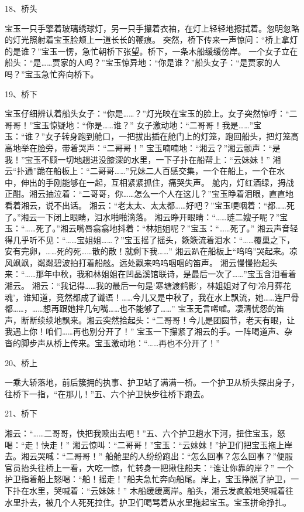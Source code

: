 18、桥头\par
宝玉一只手擎着玻璃绣球灯，另一只手攥着衣袖，在灯上轻轻地擦拭着。忽明忽略的灯光照射着宝玉脸颊上一道长长的鞭痕。
突然，桥下传来一声惊问：“桥上拿灯的是谁？”宝玉一愣，急忙朝桥下张望。桥下，一条木船缓缓傍岸。
一个女子立在船头：“是……贾家的人吗？”宝玉惊异地：“你是谁？”船头女子：“是贾家的人吗？”宝玉急忙奔向桥下。

19、桥下\par
宝玉仔细辨认着船头女子：“你是……？”灯光映在宝玉的脸上。女子突然惊呼：“二哥哥！”宝玉惊疑地：“你是……谁？”
女子激动地：“二哥哥！我是……”宝玉：“谁？”女子转身跑到舱口，一把拔出插在舱门上的灯笼，跑回船头，把灯笼高高地举在脸旁，带着哭声：“二哥哥！”
宝玉喃喃地：“湘云？”湘云颤声：“是我！”宝玉不顾一切地趟进没膝深的水里，一下子扑在船帮上：“云妹妹！”
湘云“扑通”跪在船板上：“二哥哥……”兄妹二人百感交集，一个在船上，一个在水中，伸出的手刚能够在一起，互相紧紧抓住，痛哭失声。
舱内，灯红酒绿，拇战正酣。湘云抽泣着：“二哥哥，你……怎么一个人在这儿？”宝玉睁着泪眼，直直地看着湘云，说不出话。
湘云：“老太太、太太都……好吧？”宝玉哽咽着：“都……死了。”湘云一下闭上眼睛，泪水啪啪滴落。
湘云睁开眼睛：“……琏二嫂子呢？”宝玉：“……死了。”湘云嘴唇翕翕地抖着：“林姐姐呢？”宝玉：“……死了。”
湘云声音轻得几乎听不见：“……宝姐姐……？”宝玉摇了摇头，簌簌流着泪水：“……覆巢之下，安有完卵，……死的死……散的散！就剩下我……”
湘云趴在船板上“呜呜”哭起来。凉风飒飒，粼粼碧波拍打着船舷。远处飘来呜呜咽咽的笛声。
湘云慢慢抬起头来：“……那年中秋，我和林姐姐在凹晶溪馆联诗，是最后一次了……”宝玉含泪看着湘云。
湘云：“我记得……我的最后一句是‘寒塘渡鹤影’，林姐姐对了句‘冷月葬花魂’，谁知道，竞然都成了谶语！……今儿又是中秋了，我在水上飘流，她……连尸骨都……，……想再跟她拌几句嘴……也不能够了……”
宝玉无言唏嘘。凄清忧怨的笛声，断断续续地飘来。湘云突然拾起头：“二哥哥！今儿是团圆节，老天有眼，让我遇上你！咱们……再也别分开了！”
宝玉一下攥紧了湘云的手。一阵喝道声、杂沓的脚步声从桥上传来。宝玉激动地：“……再也不分开了！”

20、桥上\par
一乘大轿落地，前后簇拥的执事、护卫站了满满一桥。一个护卫从桥头探出身子，往桥下一指，“在那儿！”五、六个护卫快步往桥下跑去。

21、桥下\par
湘云：“……二哥哥，快把我赎出去吧！”五、六个护卫趟水下河，扭住宝玉，怒喝：“走！快走！”
湘云惊叫：“二哥哥！”宝玉：“云妹妹！”护卫们把宝玉拖上岸去。湘云哭喊：“二哥哥！”
船舱里的人纷纷跑出：“怎么回事？怎么回事？”便服官员抬头往桥上一看，大吃一惊，忙转身一把揪住船夫：“谁让你靠的岸？”
一个护卫指着船上怒喝：“船！摇走！”船夫急忙奔向船尾。岸上，宝玉挣脱了护卫，一下扑在水里，哭喊着：“云妹妹！”
木船缓缓离岸。船头，湘云发疯般地哭喊着往水里扑去，被几个人死死拉住。护卫们喝骂着从水里拖起宝玉。宝玉拼命挣扎。

